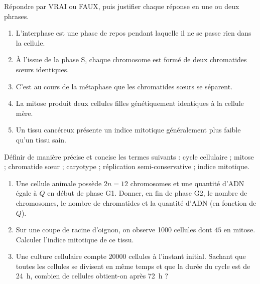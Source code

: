 \documentclass[11pt]{article}
\newcommand{\cle}[1]{{\popxbold\color{popdark}#1}}
\newcounter{popsec}
\newcounter{popsub}
\newcommand{\courssub}[1]{%
  \stepcounter{popsub}%
  \par\vspace{9pt}\noindent{\popxbold\fontsize{11.5}{13}\selectfont\color{popink}{\color{poporange}\thepopsec.\thepopsub}\hspace{6pt}#1}\par\nopagebreak\vspace{4pt}
}
\begin{document}
\begin{exercice}
Répondre par VRAI ou FAUX, puis justifier chaque réponse en une ou deux phrases.
\begin{enumerate}
\item L'interphase est une phase de repos pendant laquelle il ne se passe rien dans la cellule.
\item À l'issue de la phase S, chaque chromosome est formé de deux chromatides sœurs identiques.
\item C'est au cours de la métaphase que les chromatides sœurs se séparent.
\item La mitose produit deux cellules filles génétiquement identiques à la cellule mère.
\item Un tissu cancéreux présente un indice mitotique généralement plus faible qu'un tissu sain.
\end{enumerate}
\end{exercice}

\begin{exercice}
Définir de manière précise et concise les termes suivants : \cle{cycle cellulaire} ; \cle{mitose} ; \cle{chromatide sœur} ; \cle{caryotype} ; \cle{réplication semi-conservative} ; \cle{indice mitotique}.
\end{exercice}

\begin{exercice}
\begin{enumerate}
\item Une cellule animale possède $2n = 12$ chromosomes et une quantité d'ADN égale à $Q$ en début de phase G1. Donner, en fin de phase G2, le nombre de chromosomes, le nombre de chromatides et la quantité d'ADN (en fonction de $Q$).
\item Sur une coupe de racine d'oignon, on observe \num{1000} cellules dont $45$ en mitose. Calculer l'indice mitotique de ce tissu.
\item Une culture cellulaire compte \num{20000} cellules à l'instant initial. Sachant que toutes les cellules se divisent en même temps et que la durée du cycle est de \SI{24}{h}, combien de cellules obtient-on après \SI{72}{h} ?
\end{enumerate}
\end{exercice}

\courssub{Je m'entraîne}
\end{document}
